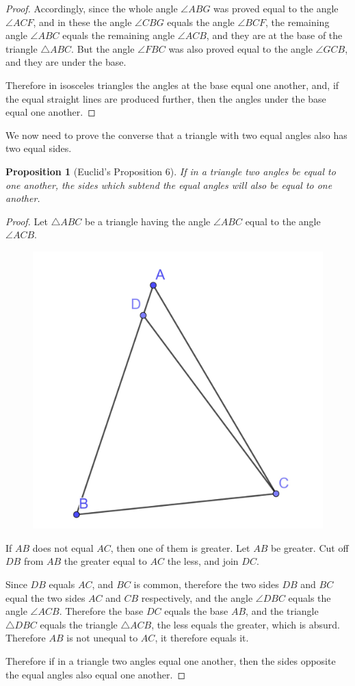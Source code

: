\documentclass[
]{book}
\newtheorem{proposition}{Proposition}[chapter]
\theoremstyle{definition}
\theoremstyle{definition}
\theoremstyle{definition}
\theoremstyle{definition}
\theoremstyle{remark}
\begin{document}
\begin{proof}
Accordingly, since the whole angle \(\angle ABG\) was proved equal to the angle \(\angle ACF\), and in these the angle \(\angle CBG\) equals the angle \(\angle BCF\), the remaining angle \(\angle ABC\) equals the remaining angle \(\angle ACB\), and they are at the base of the triangle \(\triangle ABC\). But the angle \(\angle FBC\) was also proved equal to the angle \(\angle GCB\), and they are under the base.

Therefore in isosceles triangles the angles at the base equal one another, and, if the equal straight lines are produced further, then the angles under the base equal one another.
\end{proof}

We now need to prove the converse that a triangle with two equal angles also has two equal sides.

\begin{proposition}[Euclid's Proposition 6]
\protect\hypertarget{prp:prop6}{}\label{prp:prop6}If in a triangle two angles be equal to one another, the sides which subtend the equal angles will also be equal to one another.
\end{proposition}

\begin{proof}
Let \(\triangle ABC\) be a triangle having the angle \(\angle ABC\) equal to the angle \(\angle ACB\).

\begin{figure}

{\centering \includegraphics[width=0.3\linewidth]{images/Prop6} 

}

\end{figure}

If \(AB\) does not equal \(AC\), then one of them is greater. Let \(AB\) be greater. Cut off \(DB\) from \(AB\) the greater equal to \(AC\) the less, and join \(DC\).

Since \(DB\) equals \(AC\), and \(BC\) is common, therefore the two sides \(DB\) and \(BC\) equal the two sides \(AC\) and \(CB\) respectively, and the angle \(\angle DBC\) equals the angle \(\angle ACB\). Therefore the base \(DC\) equals the base \(AB\), and the triangle \(\triangle DBC\) equals the triangle \(\triangle ACB\), the less equals the greater, which is absurd. Therefore \(AB\) is not unequal to \(AC\), it therefore equals it.

Therefore if in a triangle two angles equal one another, then the sides opposite the equal angles also equal one another.
\end{proof}
\end{document}

